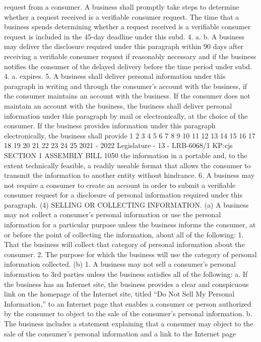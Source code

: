 request from a consumer. A business shall promptly take steps to determine whether
a request received is a verifiable consumer request. The time that a business spends
determining whether a request received is a verifiable consumer request is included
in the 45-day deadline under this subd. 4. a.
b. A business may deliver the disclosure required under this paragraph within
90 days after receiving a verifiable consumer request if reasonably necessary and if
the business notifies the consumer of the delayed delivery before the time period
under subd. 4. a. expires.
5. A business shall deliver personal information under this paragraph in
writing and through the consumer's account with the business, if the consumer
maintains an account with the business. If the consumer does not maintain an
account with the business, the business shall deliver personal information under this
paragraph by mail or electronically, at the choice of the consumer. If the business
provides information under this paragraph electronically, the business shall provide
1
2
3
4
5
6
7
8
9
10
11
12
13
14
15
16
17
18
19
20
21
22
23
24
25
2021 - 2022 Legislature - 13 - LRB-6068/1
KP:cjs
SECTION 1 ASSEMBLY BILL 1050
the information in a portable and, to the extent technically feasible, a readily useable
format that allows the consumer to transmit the information to another entity
without hindrance.
6. A business may not require a consumer to create an account in order to
submit a verifiable consumer request for a disclosure of personal information
required under this paragraph.
(4) SELLING OR COLLECTING INFORMATION. (a) A business may not collect a
consumer's personal information or use the personal information for a particular
purpose unless the business informs the consumer, at or before the point of collecting
the information, about all of the following:
1. That the business will collect that category of personal information about the
consumer.
2. The purpose for which the business will use the category of personal
information collected.
(b) 1. A business may not sell a consumer's personal information to 3rd parties
unless the business satisfies all of the following:
a. If the business has an Internet site, the business provides a clear and
conspicuous link on the homepage of the Internet site, titled “Do Not Sell My
Personal Information,” to an Internet page that enables a consumer or person
authorized by the consumer to object to the sale of the consumer's personal
information.
b. The business includes a statement explaining that a consumer may object
to the sale of the consumer's personal information and a link to the Internet page
